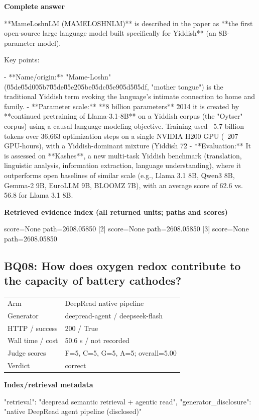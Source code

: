 \documentclass[10pt]{article}
\begin{document}
\textbf{Complete answer}
\begin{AnswerText}
**MameLoshnLM (MAMELOSHNLM)** is described in the paper as **the first open-source large language model built specifically for Yiddish** (an 8B-parameter model).

Key points:

- **Name/origin:** "Mame-Loshn" (\u05de\u05d0\u05b7\u05de\u05e2\u05be\u05dc\u05e9\u05d5\u05df, "mother tongue") is the traditional Yiddish term evoking the language's intimate connection to home and family.
- **Parameter scale:** **8 billion parameters** \u2014 it is created by **continued pretraining of Llama-3.1-8B** on a Yiddish corpus (the "Oytser" corpus) using a causal language modeling objective. Training used ~5.7 billion tokens over 36,663 optimization steps on a single NVIDIA H200 GPU (~207 GPU-hours), with a Yiddish-dominant mixture (Yiddish 72%
- **Evaluation:** It is assessed on **Kashes**, a new multi-task Yiddish benchmark (translation, linguistic analysis, information extraction, language understanding), where it outperforms open baselines of similar scale (e.g., Llama 3.1 8B, Qwen3 8B, Gemma-2 9B, EuroLLM 9B, BLOOMZ 7B), with an average score of 62.6 vs. 56.8 for Llama 3.1 8B.
\end{AnswerText}

\textbf{Retrieved evidence index (all returned units; paths and scores) }
\begin{EvidenceText}
[1] score=None path=2608.05850
[2] score=None path=2608.05850
[3] score=None path=2608.05850
\end{EvidenceText}
\subsection{BQ08: How does oxygen redox contribute to the capacity of battery cathodes?}
\begin{tabular}{@{}ll@{}}
Arm & DeepRead native pipeline\\
Generator & deepread-agent / deepseek-flash\\
HTTP / success & 200 / True\\
Wall time / cost & 50.6 s / not recorded\\
Judge scores & F=5, C=5, G=5, A=5; overall=5.00\\
Verdict & correct\\
\end{tabular}

\textbf{Index/retrieval metadata}
\begin{EvidenceText}
{
  "retrieval": "deepread semantic retrieval + agentic read",
  "generator_disclosure": "native DeepRead agent pipeline (disclosed)"
}
\end{EvidenceText}
\end{document}

